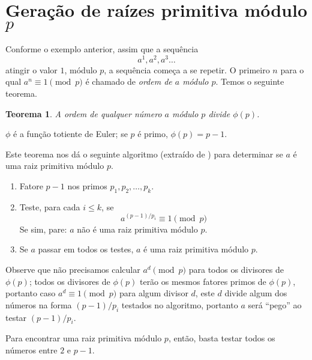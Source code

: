 \documentclass{article}
\newtheorem{theorem}{Teorema}
\theoremstyle{definition}
\begin{document}
\section{Geração de raízes primitiva módulo $p$}

Conforme o exemplo anterior,
assim que a sequência
\begin{equation*}
    a^1, a^2, a^3 \ldots
\end{equation*}
atingir o valor $1$, módulo $p$,
a sequência começa a se repetir.
O primeiro $n$ para o qual $a^n \equiv 1 \pmod p$
é chamado de \emph{ordem de $a$ módulo $p$}.
Temos o seguinte teorema.

\begin{theorem}
    A ordem de qualquer número $a$ módulo $p$ divide $\phi(p)$.
\end{theorem}

$\phi$ é a função totiente de Euler;
se $p$ é primo, $\phi(p) = p-1$.

Este teorema nos dá o seguinte algoritmo
(extraído de \cite{PrimitiveRootsStackOverflow})
para determinar se $a$ é uma raiz primitiva módulo $p$.

\begin{enumerate}
    \item Fatore $p-1$ nos primos $p_1, p_2, \ldots, p_k$.
    \item Teste, para cada $i \leq k$, se
        \begin{equation*}
            a^{(p-1)/p_i} \equiv 1 \pmod p
        \end{equation*}
        Se sim, pare: $a$ não é uma raiz primitiva módulo $p$.
    \item Se $a$ passar em todos os testes,
        $a$ é uma raiz primitiva módulo $p$.
\end{enumerate}

Observe que não precisamos calcular $a^d \pmod p$
para todos os divisores de $\phi(p)$;
todos os divisores de $\phi(p)$ terão os mesmos fatores primos de $\phi(p)$,
portanto caso $a^d \equiv 1 \pmod p$ para algum divisor $d$,
este $d$ divide algum dos números na forma $(p-1)/p_i$ testados no algoritmo,
portanto $a$ será ``pego'' ao testar $(p-1)/p_i$.

Para encontrar uma raiz primitiva módulo $p$,
então,
basta testar todos os números entre $2$ e $p-1$.
\end{document}

